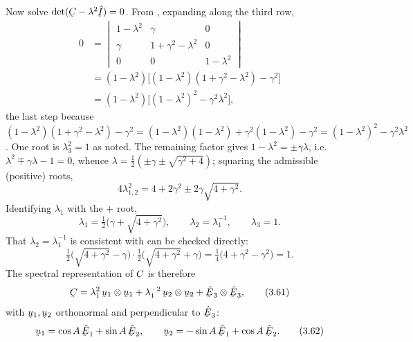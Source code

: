 Now solve $\det(\bC-\lambda^{2}\hI)=0$. From , expanding along the
third row,
\begin{equation}
\begin{aligned}
   0&=\begin{vmatrix}1-\lambda^{2}&\gamma&0\\
      \gamma&1+\gamma^{2}-\lambda^{2}&0\\ 0&0&1-\lambda^{2}\end{vmatrix}\\
   &=(1-\lambda^{2})\big[(1-\lambda^{2})(1+\gamma^{2}-\lambda^{2})
     -\gamma^{2}\big]\\
   &=(1-\lambda^{2})\big[(1-\lambda^{2})^{2}-\gamma^{2}\lambda^{2}\big],
\end{aligned}
   \tag{3.58}\label{eq:3.58}
\end{equation}
the last step because
$(1-\lambda^{2})(1+\gamma^{2}-\lambda^{2})-\gamma^{2}
=(1-\lambda^{2})(1-\lambda^{2})+\gamma^{2}(1-\lambda^{2})-\gamma^{2}
=(1-\lambda^{2})^{2}-\gamma^{2}\lambda^{2}$.
One root is $\lambda_{3}^{2}=1$ as noted. The remaining factor gives
$1-\lambda^{2}=\pm\gamma\lambda$, i.e.\ $\lambda^{2}\mp\gamma\lambda-1=0$,
whence $\lambda=\tfrac12(\pm\gamma\pm\sqrt{\gamma^{2}+4})$; squaring the
admissible (positive) roots,
\begin{equation}
   4\lambda^{2}_{1,2}=4+2\gamma^{2}\pm2\gamma\sqrt{4+\gamma^{2}} .
   \tag{3.59}\label{eq:3.59}
\end{equation}
Identifying $\lambda_{1}$ with the $+$ root,
\begin{equation}
   \lambda_{1}=\tfrac12\big(\gamma+\sqrt{4+\gamma^{2}}\big),\qquad
   \lambda_{2}=\lambda_{1}^{-1},\qquad \lambda_{3}=1 .
   \tag{3.60}\label{eq:3.60}
\end{equation}
That $\lambda_{2}=\lambda_{1}^{-1}$ is consistent with  can be
checked directly:
\[
   \tfrac12\big(\sqrt{4+\gamma^{2}}-\gamma\big)\cdot
   \tfrac12\big(\sqrt{4+\gamma^{2}}+\gamma\big)
   =\tfrac14\big(4+\gamma^{2}-\gamma^{2}\big)=1 .
\]
The spectral representation of $\bC$ is therefore
\begin{equation}
   \bC=\lambda_{1}^{2}\,\bu_{1}\otimes\bu_{1}
      +\lambda_{1}^{-2}\,\bu_{2}\otimes\bu_{2}
      +\hbE_{3}\otimes\hbE_{3},
   \tag{3.61}\label{eq:3.61}
\end{equation}
with $\bu_{1},\bu_{2}$ orthonormal and perpendicular to $\hbE_{3}$:
\begin{equation}
   \bu_{1}=\cos A\,\hbE_{1}+\sin A\,\hbE_{2},\qquad
   \bu_{2}=-\sin A\,\hbE_{1}+\cos A\,\hbE_{2}.
   \tag{3.62}\label{eq:3.62}
\end{equation}
